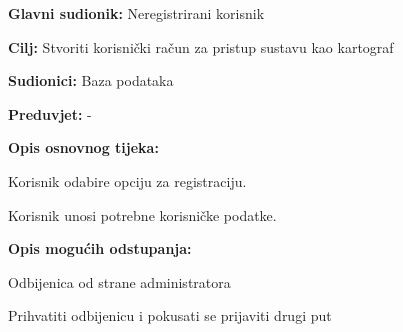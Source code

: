 				\begin{packed_item}
					
					\item \textbf{Glavni sudionik: }Neregistrirani korisnik
					\item  \textbf{Cilj:} Stvoriti korisnički račun za pristup sustavu kao kartograf
					\item  \textbf{Sudionici:} Baza podataka
					\item  \textbf{Preduvjet:} -
					\item  \textbf{Opis osnovnog tijeka:}
					
					\item[] \begin{packed_enum}
						
						\item Korisnik odabire opciju za registraciju.
						\item Korisnik unosi potrebne korisničke podatke.
					\end{packed_enum}
					
					\item  \textbf{Opis mogućih odstupanja:}
					
					\item[] \begin{packed_item}
						
						\item[2.a] Odbijenica od strane administratora
						\item[] \begin{packed_enum}
							
							\item Prihvatiti odbijenicu i pokusati se prijaviti drugi put
							
						\end{packed_enum}
						
					\end{packed_item}
				\end{packed_item}
			\noindent {}
